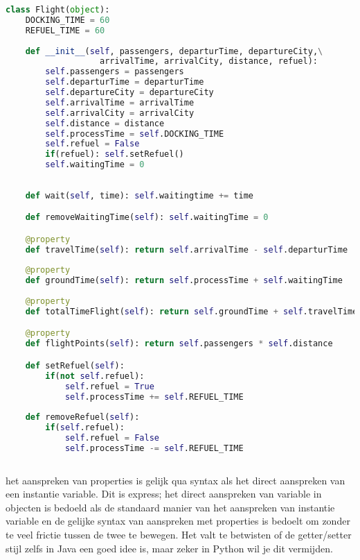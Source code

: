 \documentclass[a4paper]{article}
\begin{document}
\begin{lstlisting}[language=Python] 
class Flight(object):
    DOCKING_TIME = 60
    REFUEL_TIME = 60
    
    def __init__(self, passengers, departurTime, departureCity,\
                   arrivalTime, arrivalCity, distance, refuel):
        self.passengers = passengers
        self.departurTime = departurTime
        self.departureCity = departureCity
        self.arrivalTime = arrivalTime
        self.arrivalCity = arrivalCity
        self.distance = distance
        self.processTime = self.DOCKING_TIME
        self.refuel = False
        if(refuel): self.setRefuel()
        self.waitingTime = 0
    
    
    def wait(self, time): self.waitingtime += time

    def removeWaitingTime(self): self.waitingTime = 0

    @property 
    def travelTime(self): return self.arrivalTime - self.departurTime
    
    @property
    def groundTime(self): return self.processTime + self.waitingTime
    
    @property        
    def totalTimeFlight(self): return self.groundTime + self.travelTime

    @property        
    def flightPoints(self): return self.passengers * self.distance

    def setRefuel(self):
        if(not self.refuel):
            self.refuel = True
            self.processTime += self.REFUEL_TIME
    
    def removeRefuel(self):
        if(self.refuel):
            self.refuel = False
            self.processTime -= self.REFUEL_TIME
    
\end{lstlisting}
het aanspreken van properties is gelijk qua syntax als het direct aanspreken van een instantie variable. Dit is express; het direct aanspreken van variable in objecten is bedoeld als de standaard manier van het aanspreken van instantie variable en de gelijke syntax van aanspreken met properties is bedoelt om zonder te veel frictie tussen de twee te bewegen. Het valt te betwisten of de getter/setter stijl zelfs in Java een goed idee is, maar zeker in Python wil je dit vermijden. \\
\end{document}
